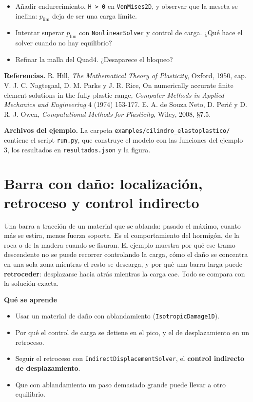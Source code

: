 \documentclass[11pt,oneside]{report}
\renewcommand{\chaptermark}[1]{\markboth{Cap.\ \thechapter\ ---\ #1}{}}
\begin{document}
\begin{itemize}
  \item Añadir endurecimiento, \texttt{H \textgreater{} 0} en \texttt{VonMises2D}, y observar que la meseta se inclina: $p_{\mathrm{lim}}$ deja de ser una carga límite.
  \item Intentar superar $p_{\mathrm{lim}}$ con \texttt{NonlinearSolver} y control de carga. ¿Qué hace el solver cuando no hay equilibrio?
  \item Refinar la malla del Quad4. ¿Desaparece el bloqueo?
\end{itemize}

\textbf{Referencias.} R. Hill, \textit{The Mathematical Theory of Plasticity}, Oxford, 1950, cap. V. J. C. Nagtegaal, D. M. Parks y J. R. Rice, \textquotedbl{}On numerically accurate finite element solutions in the fully plastic range\textquotedbl{}, \textit{Computer Methods in Applied Mechanics and Engineering} 4 (1974) 153-177. E. A. de Souza Neto, D. Perić y D. R. J. Owen, \textit{Computational Methods for Plasticity}, Wiley, 2008, §7.5.

\textbf{Archivos del ejemplo.} La carpeta \texttt{examples/\allowbreak{}cilindro\_\allowbreak{}elastoplastico/\allowbreak{}} contiene el script \texttt{run.py}, que construye el modelo con las funciones del ejemplo 3, los resultados en \texttt{resultados.json} y la figura.


\newpage

\chapter{Barra con daño: localización, retroceso y control indirecto}
\chaptermark{Barra con daño}
\label{cap:barra_dano_localizado}





Una barra a tracción de un material que se ablanda: pasado el máximo, cuanto más se estira, menos fuerza soporta. Es el comportamiento del hormigón, de la roca o de la madera cuando se fisuran. El ejemplo muestra por qué ese tramo descendente no se puede recorrer controlando la carga, cómo el daño se concentra en una sola zona mientras el resto se descarga, y por qué una barra larga puede \textbf{retroceder}: desplazarse hacia atrás mientras la carga cae. Todo se compara con la solución exacta.

\textbf{Qué se aprende}

\begin{itemize}
  \item Usar un material de daño con ablandamiento (\texttt{IsotropicDamage1D}).
  \item Por qué el control de carga se detiene en el pico, y el de desplazamiento en un retroceso.
  \item Seguir el retroceso con \texttt{IndirectDisplacementSolver}, el \textbf{control indirecto de desplazamiento}.
  \item Que con ablandamiento un paso demasiado grande puede llevar a otro equilibrio.
\end{itemize}
\end{document}
